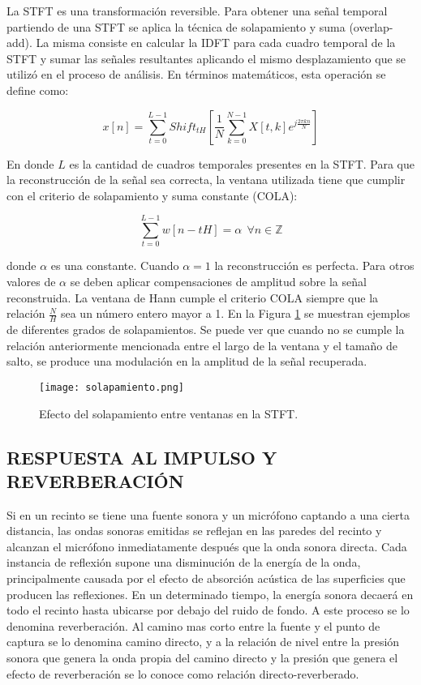 La STFT es una transformación reversible. Para obtener una señal temporal partiendo de una STFT se aplica la técnica de solapamiento y suma (overlap-add). La misma consiste en calcular la IDFT para cada cuadro temporal de la STFT y sumar las señales resultantes aplicando el mismo desplazamiento que se utilizó en el proceso de análisis. En términos matemáticos, esta operación se define como:

\begin{equation}
\label{eqn:ISTFT}
	x[n] = \sum_{t=0}^{L-1}Shift_{tH}[\frac{1}{N}\sum_{k=0}^{N-1}X[t,k]e^{j\frac{2\pi kn}{N}}]
\end{equation}

En donde $L$ es la cantidad de cuadros temporales presentes en la STFT. Para que la reconstrucción de la señal sea correcta, la ventana utilizada tiene que cumplir con el criterio de solapamiento y suma constante (COLA):

\begin{equation}
\label{eqn:COLA}
		\sum_{t=0}^{L-1}w[n-tH] = \alpha \ \ \forall n \in  \mathbb{Z}
\end{equation}

donde $\alpha$ es una constante. Cuando $\alpha = 1$ la reconstrucción es perfecta. Para otros valores de $\alpha$ se deben aplicar compensaciones de amplitud sobre la señal reconstruida. La ventana de Hann cumple el criterio COLA siempre que la relación $\frac{N}{H}$ sea un número entero mayor a 1. En la Figura \ref{fig:solapa} se muestran ejemplos de diferentes grados de solapamientos. Se puede ver que cuando no se cumple la relación anteriormente mencionada entre el largo de la ventana y el tamaño de salto, se produce una modulación en la amplitud de la señal recuperada. 

 \begin{figure}[H]
  \centering{}
  \texttt{[image: solapamiento.png]}
  \caption{Efecto del solapamiento entre ventanas en la STFT.}
  \label{fig:solapa}
\end{figure}

\subsection[Respuesta al impulso y reverberación]{RESPUESTA AL IMPULSO Y REVERBERACIÓN}

Si en un recinto se tiene una fuente sonora y un micrófono captando a una cierta distancia, las ondas sonoras emitidas se reflejan en las paredes del recinto y alcanzan el micrófono inmediatamente después que la onda sonora directa. Cada instancia de reflexión supone una disminución de la energía de la onda, principalmente causada por el efecto de absorción acústica de las superficies que producen las reflexiones. En un determinado tiempo, la energía sonora decaerá en todo el recinto hasta ubicarse por debajo del ruido de fondo. A este proceso se lo denomina reverberación. Al camino mas corto entre la fuente y el punto de captura se lo denomina camino directo, y a la relación de nivel entre la presión sonora que genera la onda propia del camino directo y la presión que genera el efecto de reverberación se lo conoce como relación directo-reverberado. 

